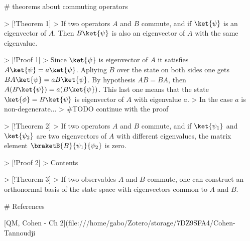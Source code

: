 # theorems about commuting operators


> [!Theorem 1]
> If two operators $A$ and $B$ commute, and if $\ket{\psi}$ is an eigenvector of $A$. Then $B \ket{\psi}$ is also an eigenvector of $A$ with the same eigenvalue.

> [!Proof 1] 
> Since $\ket{\psi}$ is eigenvector of $A$ it satisfies $A\ket{\psi} = a\ket{\psi}$. Apliying $B$ over the state on both sides one gets $BA\ket{\psi} = aB\ket{\psi}$. By hypothesis $AB = BA$, then $A(B\ket{\psi}) = a(B\ket{\psi})$. This last one means that the state $\ket{\phi} = B\ket{\psi}$ is eigenvector of $A$ with eigenvalue $a$.
> In the case $a$ is non-degenerate...
> #TODO continue with the proof

> [!Theorem 2]
> If two operators $A$ and $B$ commute, and if $\ket{ \psi_{1}}$ and $\ket{ \psi_{2}}$ are two eigenvectors of $A$ with different eigenvalues, the matrix element $\braketB{B}{\psi_{1}}{\psi_{2}}$ is zero.

> [!Proof 2]
> Contents


> [!Theorem 3]
> If two observables $A$ and $B$ commute, one can construct an orthonormal basis of the state space with eigenvectors common to $A$ and $B$.

# References

[QM, Cohen - Ch 2](file:///home/gabo/Zotero/storage/7DZ9SFA4/Cohen-Tannoudji%


 

